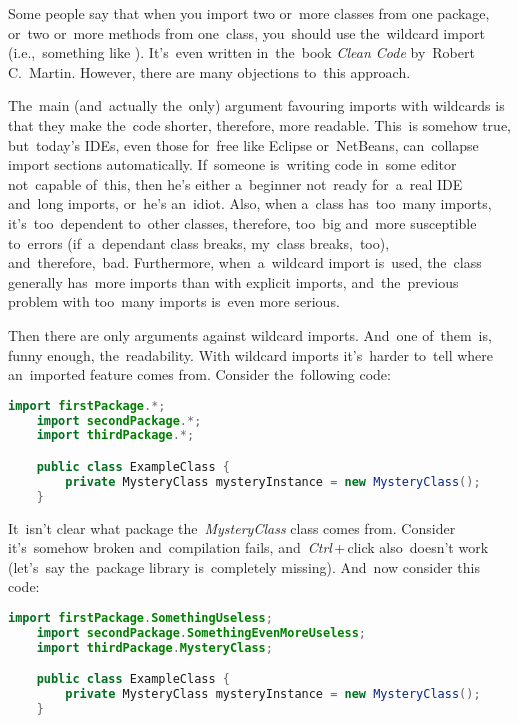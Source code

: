 Some people say that when you import two or~more classes from one package, or~two or~more methods from one~class, you~should use the~wildcard import (i.e.,~something like ).
It's~even written in~the~book \textit{Clean Code} by~Robert C.~Martin.
However, there are many objections to~this approach.

The~main (and~actually the~only) argument favouring imports with wildcards is that they make the~code shorter, therefore, more readable.
This~is somehow true, but~today's IDEs, even those for~free like Eclipse or~NetBeans, can~collapse import sections automatically.
If~someone is~writing code in~some editor not~capable of~this, then he's either a~beginner not~ready for~a~real IDE and~long imports, or~he's an~idiot.
Also, when a~class has~too~many imports, it's~too~dependent to~other classes, therefore, too~big and~more susceptible to~errors (if~a~dependant class breaks, my~class breaks,~too), and~therefore,~bad.
Furthermore, when~a~wildcard import is~used, the~class generally has~more imports than with explicit imports, and~the~previous problem with too~many imports is~even more serious.

Then there are only arguments against wildcard imports.
And~one of~them~is, funny enough, the~readability.
With wildcard imports it's~harder to~tell where an~imported feature comes from.
Consider the~following code:
\begin{lstlisting}[language=Java]
    import firstPackage.*;
    import secondPackage.*;
    import thirdPackage.*;

    public class ExampleClass {
        private MysteryClass mysteryInstance = new MysteryClass();
    }
\end{lstlisting}

\noindent It~isn't clear what package the~\textit{MysteryClass} class comes from.
Consider it's~somehow broken and~compilation fails, and~\textit{Ctrl}\,+\,click also~doesn't work (let's~say the~package library is~completely missing).
And~now consider this code:
\begin{lstlisting}[language=Java]
    import firstPackage.SomethingUseless;
    import secondPackage.SomethingEvenMoreUseless;
    import thirdPackage.MysteryClass;

    public class ExampleClass {
        private MysteryClass mysteryInstance = new MysteryClass();
    }
\end{lstlisting}

